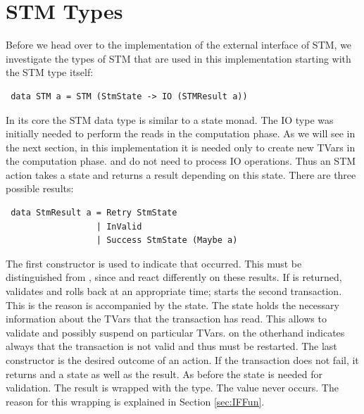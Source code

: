 \section{STM Types}
Before we head over to the implementation of the external interface of STM, we investigate the types
of STM that are used in this implementation starting with the STM type itself:
\begin{lstlisting}
 data STM a = STM (StmState -> IO (STMResult a))
\end{lstlisting}
In its core the STM data type is similar to a state monad. The IO type was initially needed to perform the reads 
in the computation phase. As we will see in the next section, in this implementation it is needed only to create new TVars
in the computation phase.  and  do not need to process IO operations.
Thus an STM action takes a state and returns a result depending on this state. There are three possible 
results:
\begin{lstlisting}
 data StmResult a = Retry StmState
                  | InValid
                  | Success StmState (Maybe a)
\end{lstlisting}
The first constructor is used to indicate that  occurred. This must be distinguished from 
, since  and  react differently on these results. If 
 is returned,  validates and rolls back at an appropriate time;  
starts the second transaction. This is the reason  is accompanied by the state.
The state holds the necessary information about the TVars that the transaction has read. This allows 
to validate and possibly suspend on particular TVars.  on the otherhand indicates
always that the transaction is not valid and thus must be restarted. 
The last constructor is the desired outcome of an action. If the transaction does not fail, it returns
 and a state as well as the result. As before the state is needed for validation.
The result is wrapped with the  type. The value  never occurs. 
The reason for this wrapping is explained in Section \ref{sec:IFFun}. 

